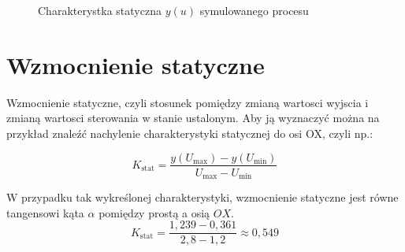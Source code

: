 \begin{figure}[b]   
     \label{zad2_char_stat}
    \centering
    \caption{Charakterystka statyczna $y(u)$ symulowanego procesu}

\end{figure}

\section{Wzmocnienie statyczne}
\label{zad2_wzmocnienie}
Wzmocnienie statyczne, czyli stosunek pomiędzy zmianą wartosci wyjscia i zmianą wartosci sterowania w stanie ustalonym. Aby ją wyznaczyć można na przykład znaleźć nachylenie charakterystyki statycznej do osi OX, czyli np.:

\begin{equation}
K_{\mathrm{stat}} = \frac{y(U_{\mathrm{max}})- y(U_{\mathrm{min}})}{U_{\mathrm{max}}- U_{\mathrm{min}}}
\label{zad2_wzm_statyczne_wzor}
\end{equation}

W przypadku tak wykreślonej charakterystyki, wzmocnienie statyczne jest równe tangensowi kąta $\alpha$
pomiędzy prostą a osią $OX$. 
\begin{equation}
K_{\mathrm{stat}} = \frac{1,239- 0,361}{2,8- 1,2}\approx 0,549
\label{zad2_wzm_statyczne_podstawienie}
\end{equation}
